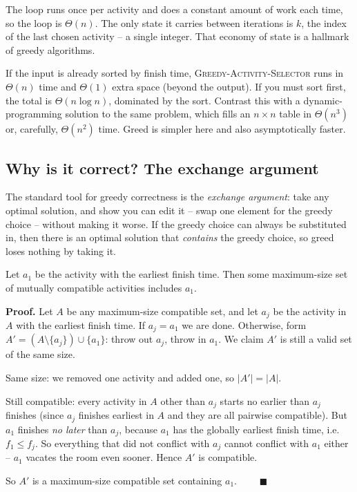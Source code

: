 The loop runs once per activity and does a constant amount of work each time, so
the loop is $\Theta(n)$. The only state it carries between iterations is $k$, the
index of the last chosen activity -- a single integer. That economy of state is a
hallmark of greedy algorithms.

\begin{complexitybox}
If the input is already sorted by finish time, \textsc{Greedy-Activity-Selector}
runs in $\Theta(n)$ time and $\Theta(1)$ extra space (beyond the output). If you
must sort first, the total is $\Theta(n \log n)$, dominated by the sort.
Contrast this with a dynamic-programming solution to the same problem, which
fills an $n \times n$ table in $\Theta(n^3)$ or, carefully, $\Theta(n^2)$ time.
Greed is simpler here and also asymptotically faster.
\end{complexitybox}

\subsection{Why is it correct? The exchange argument}

The standard tool for greedy correctness is the \emph{exchange argument}: take any optimal solution, and show you can edit it -- swap one element for the greedy choice -- without making it worse. If the greedy choice can always be substituted in, then there is
an optimal solution that \emph{contains} the greedy choice, so greed loses
nothing by taking it.

\begin{theorem}
\label{ch16:thm-activity}
Let $a_1$ be the activity with the earliest finish time. Then some maximum-size
set of mutually compatible activities includes $a_1$.
\end{theorem}

\begin{formalbox}
\textbf{Proof.} Let $A$ be any maximum-size compatible set, and let $a_j$ be the
activity in $A$ with the earliest finish time. If $a_j = a_1$ we are done.
Otherwise, form $A' = (A \setminus \{a_j\}) \cup \{a_1\}$: throw out $a_j$, throw in
$a_1$. We claim $A'$ is still a valid set of the same size.

Same size: we removed one activity and added one, so $|A'| = |A|$.

Still compatible: every activity in $A$ other than $a_j$ starts no earlier than
$a_j$ finishes (since $a_j$ finishes earliest in $A$ and they are all pairwise
compatible). But $a_1$ finishes \emph{no later} than $a_j$, because $a_1$ has the
globally earliest finish time, i.e. $f_1 \le f_j$. So everything that did not
conflict with $a_j$ cannot conflict with $a_1$ either -- $a_1$ vacates the room
even sooner. Hence $A'$ is compatible.

So $A'$ is a maximum-size compatible set containing $a_1$. $\qquad\blacksquare$
\end{formalbox}

